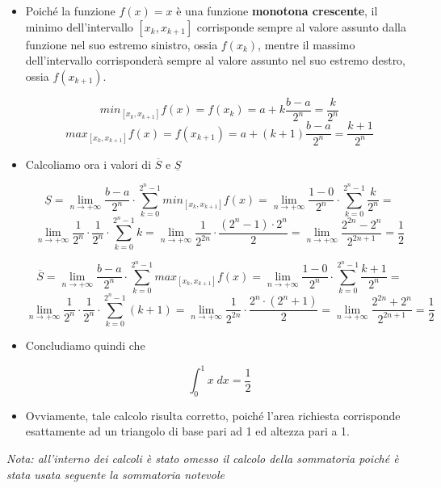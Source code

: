 \documentclass[a4paper, 12pt]{report}
\begin{document}
\begin{enumerate}
        \begin{itemize}
            \item Poiché la funzione $f(x) = x$ è una funzione \textbf{monotona crescente}, il minimo dell'intervallo $[x_k, x_{k+1}]$ corrisponde sempre al valore assunto dalla funzione nel suo estremo sinistro, ossia $f(x_k)$, mentre il massimo dell'intervallo corrisponderà sempre al valore assunto nel suo estremo destro, ossia $f(x_{k+1})$. 
            
            \[min_{[x_k, x_{k+1}]} f(x) = f(x_k) = a+k \frac{b-a}{2^n} = \frac{k}{2^n}\]
            \[max_{[x_k, x_{k+1}]} f(x) = f(x_{k+1}) = a+(k+1) \frac{b-a}{2^n} = \frac{k+1}{2^n}\]
            
            \item Calcoliamo ora i valori di $\overline{S}$ e $\underline{S}$
            
            \[ \underline{S} = \lim_{n \to +\infty} \frac{b-a}{2^n} \cdot \sum_{k=0}^{2^n-1} min_{[x_k, x_{k+1}]} f(x) = \lim_{n \to +\infty} \frac{1-0}{2^n} \cdot \sum_{k=0}^{2^n-1} \frac{k}{2^n} =\]
            \[\lim_{n \to +\infty} \frac{1}{2^n} \cdot \frac{1}{2^n} \cdot \sum_{k=0}^{2^n-1} k = \lim_{n \to +\infty} \frac{1}{2^{2n}} \cdot \frac{(2^n-1) \cdot 2^n}{2} = \lim_{n \to +\infty} \frac{2^{2n}-2^n}{2^{2n+1}} = \frac{1}{2}\]
            
            \[ \overline{S} = \lim_{n \to +\infty} \frac{b-a}{2^n} \cdot \sum_{k=0}^{2^n-1} max_{[x_k, x_{k+1}]} f(x) = \lim_{n \to +\infty} \frac{1-0}{2^n} \cdot \sum_{k=0}^{2^n-1} \frac{k+1}{2^n} =\]
            \[\lim_{n \to +\infty} \frac{1}{2^n} \cdot \frac{1}{2^n} \cdot \sum_{k=0}^{2^n-1} (k+1) = \lim_{n \to +\infty} \frac{1}{2^{2n}} \cdot \frac{2^n \cdot (2^n+1)}{2} = \lim_{n \to +\infty} \frac{2^{2n}+2^n}{2^{2n+1}} = \frac{1}{2}\]
            
            \item Concludiamo quindi che 
            
            \[ \int_{0}^{1} x \; dx = \frac{1}{2}\]
            
            \item Ovviamente, tale calcolo risulta corretto, poiché l'area richiesta corrisponde esattamente ad un triangolo di base pari ad 1 ed altezza pari a 1.
        \end{itemize}
        
        \quad
        
        \textit{Nota: all'interno dei calcoli è stato omesso il calcolo della sommatoria poiché è stata usata seguente la sommatoria notevole}
        

\end{enumerate}
\end{document}
